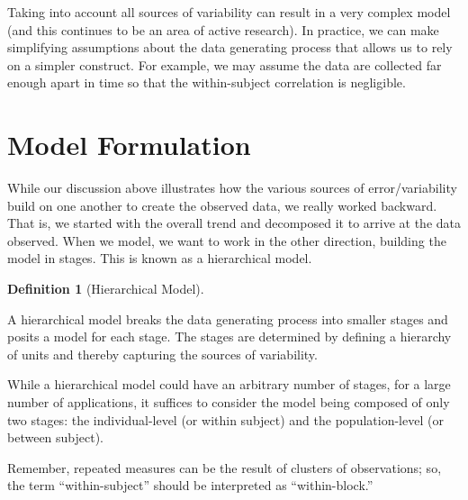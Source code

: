 \documentclass[
  letterpaper,
  DIV=11,
  numbers=noendperiod]{scrreprt}
\theoremstyle{definition}
\newtheorem{definition}{Definition}[chapter]
\theoremstyle{definition}
\theoremstyle{remark}
\begin{document}
Taking into account all sources of variability can result in a very
complex model (and this continues to be an area of active research). In
practice, we can make simplifying assumptions about the data generating
process that allows us to rely on a simpler construct. For example, we
may assume the data are collected far enough apart in time so that the
within-subject correlation is negligible.

\hypertarget{model-formulation}{%
\section{Model Formulation}\label{model-formulation}}

While our discussion above illustrates how the various sources of
error/variability build on one another to create the observed data, we
really worked backward. That is, we started with the overall trend and
decomposed it to arrive at the data observed. When we model, we want to
work in the other direction, building the model in stages. This is known
as a hierarchical model.

\begin{definition}[Hierarchical
Model]\protect\hypertarget{def-hierarchical-model}{}\label{def-hierarchical-model}

A hierarchical model breaks the data generating process into smaller
stages and posits a model for each stage. The stages are determined by
defining a hierarchy of units and thereby capturing the sources of
variability.

\end{definition}

While a hierarchical model could have an arbitrary number of stages, for
a large number of applications, it suffices to consider the model being
composed of only two stages: the individual-level (or within subject)
and the population-level (or between subject).

\begin{tcolorbox}[enhanced jigsaw, left=2mm, toprule=.15mm, arc=.35mm, breakable, opacitybacktitle=0.6, opacityback=0, rightrule=.15mm, colbacktitle=quarto-callout-note-color!10!white, coltitle=black, leftrule=.75mm, toptitle=1mm, colframe=quarto-callout-note-color-frame, titlerule=0mm, title=\textcolor{quarto-callout-note-color}{\faInfo}\hspace{0.5em}{Note}, bottomrule=.15mm, colback=white, bottomtitle=1mm]

Remember, repeated measures can be the result of clusters of
observations; so, the term ``within-subject'' should be interpreted as
``within-block.''

\end{tcolorbox}
\end{document}
